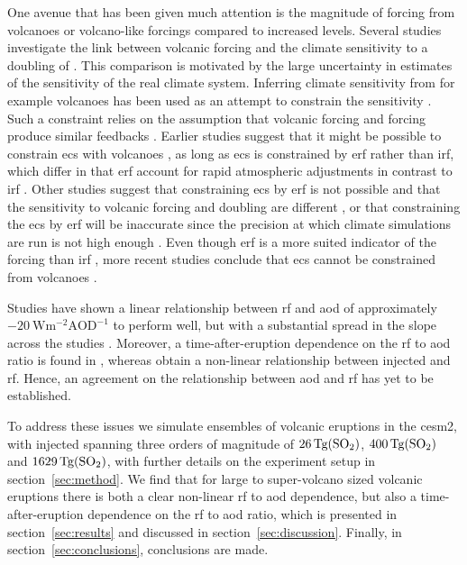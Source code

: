 \documentclass{ametsocV6.1}
\newcommand{\iso}[1][i]{{#1}njected \ce{SO2}}
\begin{document}
One avenue that has been given much attention is the magnitude of forcing from volcanoes
or volcano-like forcings compared to increased  levels. Several studies
investigate the link between volcanic forcing and the climate sensitivity to a doubling
of 
\citep{boer2007,marvel2016,merlis2014,ollila2016,richardson2019,salvi2022,wigley2005}.
This comparison is motivated by the large uncertainty in estimates of the sensitivity of
the real climate system. Inferring climate sensitivity from for example volcanoes has
been used as an attempt to constrain the sensitivity \citep{boer2007}. Such a constraint
relies on the assumption that volcanic forcing and  forcing produce similar
feedbacks \citep{pauling2023}. Earlier studies suggest that it might be possible to
constrain \gls{ecs} with volcanoes \citep{bender2010}, as long as \gls{ecs} is
constrained by \gls{erf} rather than \gls{irf}, which differ in that \gls{erf} account
for rapid atmospheric adjustments in contrast to \gls{irf} \citep{richardson2019}. Other
studies suggest that constraining \gls{ecs} by \gls{erf} is not possible and that the
sensitivity to volcanic forcing and  doubling are different
\citep{douglass2006}, or that constraining the \gls{ecs} by \gls{erf} will be inaccurate
since the precision at which climate simulations are run is not high enough
\citep{boer2007,salvi2022}. Even though \gls{erf} is a more suited indicator of the
forcing than \gls{irf} \citep{marvel2016,richardson2019}, more recent studies conclude
that \gls{ecs} cannot be constrained from volcanoes \citep{pauling2023}.

Studies have shown a linear relationship between \gls{rf} and \gls{aod} of approximately
\(-\SI{20}{\watt\metre^{-2}\mathrm{AOD}^{-1}}\) to perform well, but with a substantial
spread in the slope across the studies
\citep{mills2017,hansen2005,gregory2016,marshall2020,pitari2016b}. Moreover, a
time-after-eruption dependence on the \gls{rf} to \gls{aod} ratio is found in
\citet{marshall2020}, whereas \citet{niemeier2015} obtain a non-linear relationship
between \iso{} and \gls{rf}. Hence, an agreement on the relationship between \gls{aod}
and \gls{rf} has yet to be established.

To address these issues we simulate ensembles of volcanic eruptions in the \gls{cesm2},
with \iso{} spanning three orders of magnitude of \(\SI{26}{\tera\gram(\ce{SO2})}\),
\(\SI{400}{\tera\gram(\ce{SO2})}\) and \(\SI{1629}{\tera\gram(\ce{SO2})}\), with further
details on the experiment setup in section~\ref{sec:method}. We find that for large to
super-volcano sized volcanic eruptions there is both a clear non-linear \gls{rf} to
\gls{aod} dependence, but also a time-after-eruption dependence on the \gls{rf} to
\gls{aod} ratio, which is presented in section~\ref{sec:results} and discussed in
section~\ref{sec:discussion}. Finally, in section~\ref{sec:conclusions}, conclusions are
made.
\end{document}
